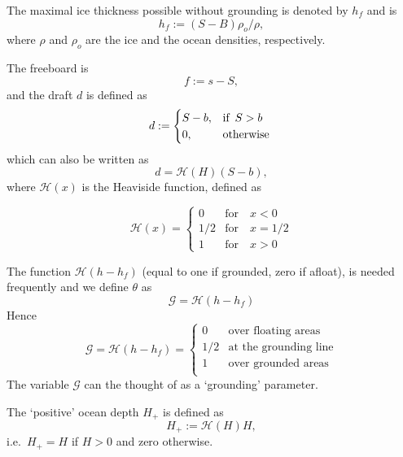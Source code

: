 \documentclass[10pt,a4paper]{book}
\newcommand{\He}{\mathcal{H}}
\newcommand{\G}{\mathcal{G}}
\begin{document}
The maximal ice thickness possible without grounding is denoted by $h_f$ and is
\[
h_f :=(S-B) \rho_o/\rho ,
\]
where $\rho$ and $\rho_o$ are  the ice and the ocean densities, respectively. 


The freeboard is
\[
f:=s-S,
\]
and the draft $d$ is defined as
\[
d:=\begin{cases} S-b , & \mbox{if } \, S>b \\  0 , & \hbox{otherwise }  \end{cases}
\]
which can also be written as
\[
d=\He(H) (S-b) ,
\]
where $\He(x)$ is the Heaviside function, defined as

\[ \He(x)=  \begin{cases} 
              0 & \text{for}   \quad x < 0 \\          
             1/2 & \text{for}  \quad x=1/2 \\
             1 & \text{for}    \quad x>0
   \end{cases}
\]

The function $\He(h-h_f)$ (equal to one if grounded, zero if afloat), is needed frequently and we define $\theta$ as
\[
\G=\He(h-h_f)
\]
Hence
\begin{equation} \G =  \He(h-h_f) = \begin{cases} 
              0 & \text{over floating areas}    \\          
             1/2 & \text{at the grounding line}\\
             1 & \text{over grounded areas}   \\
   \end{cases}
\label{eq:Gdef}
\end{equation}
The variable $\G$ can the thought of as a `grounding' parameter.

The `positive' ocean depth $H_{+}$ is defined as
\begin{equation}
H_{+} := \He(H) H ,
\label{eq:Hplus}
\end{equation}
i.e.\ $H_{+}=H$ if $H>0$ and zero otherwise.
\end{document}
